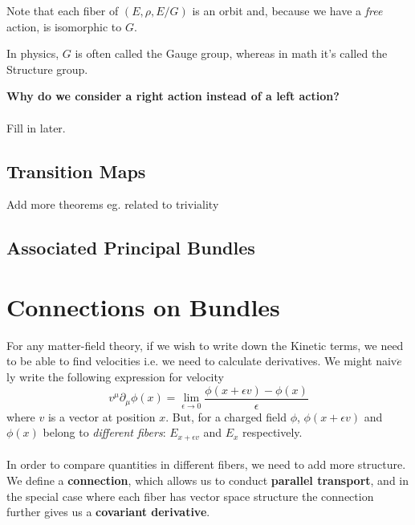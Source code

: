 \documentclass[11pt]{article}
\begin{document}
\begin{bluebox}
    Note that each fiber of $(E, \rho, E/G)$ is an orbit and, because we have a \emph{free} action, is isomorphic to $G$.
\end{bluebox}

In physics, $G$ is often called the Gauge group, whereas in math it's called the Structure group.

\begin{redbox}
    \textbf{Why do we consider a right action instead of a left action?}
    \\
    \\
    Fill in later.
\end{redbox}

\subsection*{Transition Maps}



\begin{note}
    {Add more theorems eg. related to triviality}
\end{note}

\vskip 0.5cm
\subsection{Associated Principal Bundles}

\newpage
\section{Connections on Bundles}
\vskip 0.25cm

For any matter-field theory, if we wish to write down the Kinetic terms, we need to be able to find velocities i.e. we need to calculate derivatives. We might naiv$\ddot{e}$ly write the following expression for velocity \[ v^{\mu} \partial_{\mu} \phi(x) = \lim_{\epsilon \rightarrow 0} \frac{\phi(x + \epsilon v) - \phi(x)}{\epsilon} \] where $v$ is a vector at position $x$. But, for a charged field $\phi$, $\phi(x + \epsilon v)$ and $\phi(x)$ belong to \emph{different fibers}: $E_{x + \epsilon v}$ and $E_{x}$ respectively.
\\
\\
In order to compare quantities in different fibers, we need to add more structure. We define a \textbf{connection}, which allows us to conduct \textbf{parallel transport}, and in the special case where each fiber has vector space structure the connection further gives us a \textbf{covariant derivative}.
\\
\\
\end{document}
